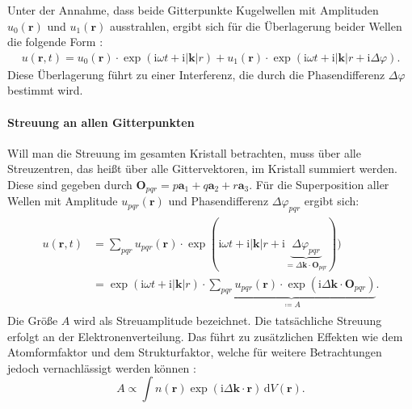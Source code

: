 Unter der Annahme, dass beide Gitterpunkte Kugelwellen mit Amplituden $u_{0}(\mathbf{r})$ und $u_{1}(\mathbf{r})$
ausstrahlen, ergibt sich für die Überlagerung beider Wellen die folgende Form \autocite{Spiess}:
\begin{align}
    u(\mathbf{r},t)=u_{0}(\mathbf{r})\cdot \exp(\mathrm{i}\omega t+\mathrm{i}\lvert \mathbf{k}
    \rvert r) + u_{1}(\mathbf{r}) \cdot \exp(\mathrm{i}\omega t + \mathrm{i}\lvert \mathbf{k}
    \rvert r+\mathrm{i}\Delta\varphi).
\end{align}
Diese Überlagerung führt zu einer Interferenz, die durch die Phasendifferenz $\Delta\varphi$ bestimmt
wird.

\paragraph{Streuung an allen Gitterpunkten}
Will man die Streuung im gesamten Kristall betrachten, muss über alle Streuzentren, das heißt über alle Gittervektoren,
im Kristall summiert werden.
Diese sind gegeben durch $\mathbf{O}_{pqr}=p\mathbf{a}_{1}+q\mathbf{a}_{2}+r\mathbf{a}_{3}$.
Für die Superposition aller Wellen mit Amplitude $u_{pqr}(\mathbf{r})$ und Phasendifferenz $\Delta\varphi_{pqr}$
ergibt sich:
\begin{align}
    \begin{split}
        u(\mathbf{r}, t)
        &=\sum_{pqr} u_{pqr}(\mathbf{r})\cdot \exp(\mathrm{i}\omega t+\mathrm{i}
        \lvert \mathbf{k} \rvert r+\mathrm{i}\underbrace{ \Delta\varphi_{pqr} }_{ = \Delta
        \mathbf{k}\cdot \mathbf{O}_{pqr}})) \\
        &=\exp(\mathrm{i}\omega t+\mathrm{i}\lvert \mathbf{k} \rvert r)\cdot
        \underbrace{ \sum_{pqr}u_{pqr}(\mathbf{r})\cdot \exp(\mathrm{i}\Delta \mathbf{k}
        \cdot \mathbf{O}_{pqr}) }_{ \coloneqq A }.
    \end{split}
    \label{eq:amplitude}
\end{align}
Die Größe $A$ wird als Streuamplitude bezeichnet.
Die tatsächliche Streuung erfolgt an der Elektronenverteilung.
Das führt zu zusätzlichen Effekten wie dem Atomformfaktor und dem Strukturfaktor,
welche für weitere Betrachtungen jedoch vernachlässigt werden können \autocite{Spiess}:
\begin{equation}
    A \propto \int n(\mathbf{r}) \exp(\mathrm{i} \Delta \mathbf{k}\cdot
    \mathbf{r}) \, \mathrm{d}V(\mathbf{r}).
    \label{eq:atomformfaktor}
\end{equation}

